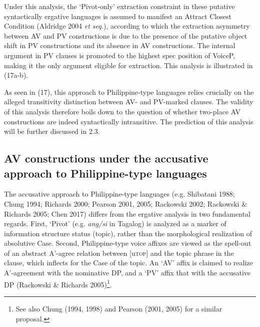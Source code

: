 \documentclass[10pt]{article}
\begin{document}
\begin{exe}
\begin{minipage}[t]{.4\textwidth}
\begin{enumerate}
{    
   
\endjtree
}

  \end{enumerate}
\end{minipage}
\end{exe}
   
\smallskip
   
Under this analysis, the `Pivot-only' extraction constraint in these putative syntactically ergative languages is assumed to manifest an Attract Closest Condition (Aldridge 2004 \textit{et seq.}), according to which the extraction asymmetry between AV and PV constructions is due to the presence of the putative object shift in PV constructions and its absence in AV constructions. The internal argument in PV clauses is promoted to the highest spec position of VoiceP, making it the only argument eligible for extraction. This analysis is illustrated in (17a-b). 


As seen in (17), this approach to  Philippine-type languages  relies crucially on the alleged transitivity distinction between AV- and PV-marked clauses. The validity of this analysis therefore boils down to the question of whether two-place AV constructions are indeed syntactically intransitive. The prediction of this analysis will be further discussed in 2.3.

\subsection{AV constructions under the accusative approach to Philippine-type languages}
\vspace{-1mm}
\noindent  
The accusative approach to Philippine-type languages (e.g. Shibatani 1988; Chung 1994; Richards 2000; Pearson 2001, 2005; Rackowski 2002; Rackowski \& Richards 2005; Chen 2017) differs from the ergative analysis in two fundamental regards. First, `Pivot' (e.g. \textit{ang/si} in Tagalog) is analyzed as a marker of information structure status (topic), rather than the morphological realization of absolutive Case. Second, Philippine-type voice affixes are viewed as the spell-out of an abstract A'-agree relation between [u\textsc{top]} and the topic phrase in the clause, which inflects for the Case of the topic. An `AV' affix is claimed to realize A'-agreement with the nominative DP, and a `PV' affix that with the accusative DP (Rackowski \& Richards 2005)\footnote{See also Chung (1994, 1998) and Pearson (2001, 2005) for a similar proposal.}. 
\end{document}
